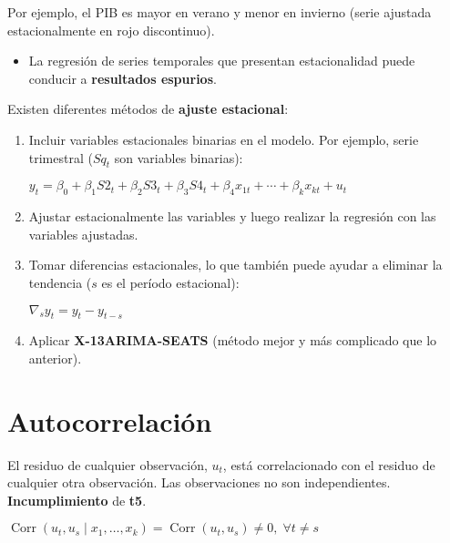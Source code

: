 \documentclass[10pt, a4paper, landscape]{article}
\DeclareMathOperator{\Corr}{Corr}
\begin{document}
\begin{multicols}{3}
\begin{multicols}{2}
\end{multicols}

Por ejemplo, el PIB es mayor en verano y menor en invierno (serie ajustada estacionalmente en {\color{red} rojo discontinuo}).

\begin{itemize}[leftmargin=*]
	\item La regresión de series temporales que presentan estacionalidad puede conducir a \textbf{resultados espurios}.
\end{itemize}

Existen diferentes métodos de \textbf{ajuste estacional}:

\begin{enumerate}[leftmargin=*, label=\alph{*}.]
	\item Incluir variables estacionales binarias en el modelo. Por ejemplo, serie trimestral (\( S q_{t} \) son variables binarias):
	\begin{center}
		\( y_{t} = \beta_{0} + \beta_{1} S2_{t} + \beta_{2} S3_{t} + \beta_{3} S4_{t} + \beta_{4} x_{1t} + \cdots + \beta_{k} x_{kt} + u_{t} \)
	\end{center}
	\item Ajustar estacionalmente las variables y luego realizar la regresión con las variables ajustadas.
	\item Tomar diferencias estacionales, lo que también puede ayudar a eliminar la tendencia (\( s \) es el período estacional):
	\begin{center}
		\( \nabla_{s} y_{t} = y_{t} - y_{t - s} \)
	\end{center}
	\item Aplicar \textbf{X-13ARIMA-SEATS} (método mejor y más complicado que lo anterior).
\end{enumerate}

\columnbreak

\section*{Autocorrelación}

El residuo de cualquier observación, \( u_{t} \), está correlacionado con el residuo de cualquier otra observación. Las observaciones no son independientes. \textbf{Incumplimiento} de \textbf{t5}.

\begin{center}
	\( \Corr(u_{t}, u_{s} \mid x_{1}, \ldots, x_{k}) = \Corr(u_{t}, u_{s}) \neq 0, \; \forall t \neq s \)
\end{center}


\end{multicols}
\end{document}
